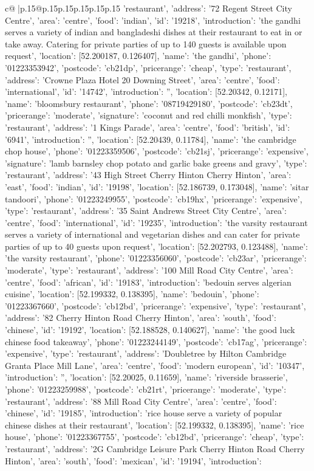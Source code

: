 \documentclass{article}
\begin{document}
{\begin{supertabular}{c@{$\;$}|p{.15\linewidth}@{}p{.15\linewidth}p{.15\linewidth}p{.15\linewidth}p{.15\linewidth}p{.15\linewidth}}
{{{'restaurant'}, {'address': '72 Regent Street City Centre', 'area': 'centre', 'food': 'indian', 'id': '19218', 'introduction': 'the gandhi serves a variety of indian and bangladeshi dishes at their restaurant to eat in or take away. Catering for private parties of up to 140 guests is available upon request', 'location': [52.200187, 0.126407], 'name': 'the gandhi', 'phone': '01223353942', 'postcode': 'cb21dp', 'pricerange': 'cheap', 'type': 'restaurant'}, {'address': 'Crowne Plaza Hotel 20 Downing Street', 'area': 'centre', 'food': 'international', 'id': '14742', 'introduction': '', 'location': [52.20342, 0.12171], 'name': 'bloomsbury restaurant', 'phone': '08719429180', 'postcode': 'cb23dt', 'pricerange': 'moderate', 'signature': 'coconut and red chilli monkfish', 'type': 'restaurant'}, {'address': '1 Kings Parade', 'area': 'centre', 'food': 'british', 'id': '6941', 'introduction': '', 'location': [52.20439, 0.11784], 'name': 'the cambridge chop house', 'phone': '01223359506', 'postcode': 'cb21sj', 'pricerange': 'expensive', 'signature': 'lamb barnsley chop potato and garlic bake greens and gravy', 'type': 'restaurant'}, {'address': '43 High Street Cherry Hinton Cherry Hinton', 'area': 'east', 'food': 'indian', 'id': '19198', 'location': [52.186739, 0.173048], 'name': 'sitar tandoori', 'phone': '01223249955', 'postcode': 'cb19hx', 'pricerange': 'expensive', 'type': 'restaurant'}, {'address': '35 Saint Andrews Street City Centre', 'area': 'centre', 'food': 'international', 'id': '19235', 'introduction': 'the varsity restaurant serves a variety of international and vegetarian dishes and can cater for private parties of up to 40 guests upon request', 'location': [52.202793, 0.123488], 'name': 'the varsity restaurant', 'phone': '01223356060', 'postcode': 'cb23ar', 'pricerange': 'moderate', 'type': 'restaurant'}, {'address': '100 Mill Road City Centre', 'area': 'centre', 'food': 'african', 'id': '19183', 'introduction': 'bedouin serves algerian cuisine', 'location': [52.199332, 0.138395], 'name': 'bedouin', 'phone': '01223367660', 'postcode': 'cb12bd', 'pricerange': 'expensive', 'type': 'restaurant'}, {'address': '82 Cherry Hinton Road Cherry Hinton', 'area': 'south', 'food': 'chinese', 'id': '19192', 'location': [52.188528, 0.140627], 'name': 'the good luck chinese food takeaway', 'phone': '01223244149', 'postcode': 'cb17ag', 'pricerange': 'expensive', 'type': 'restaurant'}, {'address': 'Doubletree by Hilton Cambridge Granta Place Mill Lane', 'area': 'centre', 'food': 'modern european', 'id': '10347', 'introduction': '', 'location': [52.20025, 0.11659], 'name': 'riverside brasserie', 'phone': '01223259988', 'postcode': 'cb21rt', 'pricerange': 'moderate', 'type': 'restaurant'}, {'address': '88 Mill Road City Centre', 'area': 'centre', 'food': 'chinese', 'id': '19185', 'introduction': 'rice house serve a variety of popular chinese dishes at their restaurant', 'location': [52.199332, 0.138395], 'name': 'rice house', 'phone': '01223367755', 'postcode': 'cb12bd', 'pricerange': 'cheap', 'type': 'restaurant'}, {'address': '2G Cambridge Leisure Park Cherry Hinton Road Cherry Hinton', 'area': 'south', 'food': 'mexican', 'id': '19194', 'introduction': }}}
\end{supertabular}}
\end{document}
